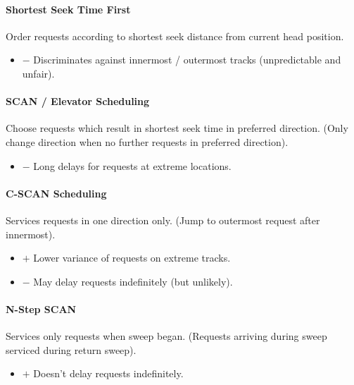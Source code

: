 \documentclass[twocolumn,english]{article}
\begin{document}
\paragraph{Shortest Seek Time First}

Order requests according to shortest seek distance from current head
position. 
\begin{itemize}
\item $-$ Discriminates against innermost / outermost tracks (unpredictable
and unfair). 
\end{itemize}

\paragraph{SCAN / Elevator Scheduling}

Choose requests which result in shortest seek time in preferred direction.
(Only change direction when no further requests in preferred direction). 
\begin{itemize}
\item $-$ Long delays for requests at extreme locations. 
\end{itemize}

\paragraph{C-SCAN Scheduling}

Services requests in one direction only. (Jump to outermost request
after innermost). 
\begin{itemize}
\item $+$ Lower variance of requests on extreme tracks. 
\item $-$ May delay requests indefinitely (but unlikely). 
\end{itemize}

\paragraph{N-Step SCAN}

Services only requests when sweep began. (Requests arriving during
sweep serviced during return sweep). 
\begin{itemize}
\item $+$ Doesn't delay requests indefinitely. 
\end{itemize}
\end{document}
